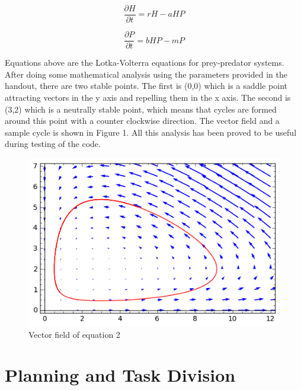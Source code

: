 \documentclass[12pt,a4paper]{article}
\begin{document}
\begin{equation}
\frac{\partial H}{\partial t}=rH-aHP
\end{equation}

\begin{equation}
\frac{\partial P}{\partial t}=bHP-mP
\end{equation}

Equations above are the Lotka-Volterra equations for prey-predator systems. After doing some mathematical analysis using the parameters provided in the handout, there are two stable points. The first is (0,0) which is a saddle point attracting vectors in the y axis and repelling them in the x axis. The second is (3,2) which is a neutrally stable point, which means that cycles are formed around this point with a counter clockwise direction. The vector field and a sample cycle is shown in Figure 1. All this analysis has been proved to be useful during testing of the code.  %


\clearpage


\begin{figure}[hb]
    \centering
    \includegraphics[scale=0.75]{images/sage2.png}
    \caption{Vector field of equation 2}
\end{figure}



\section{Planning and Task Division}
\end{document}
